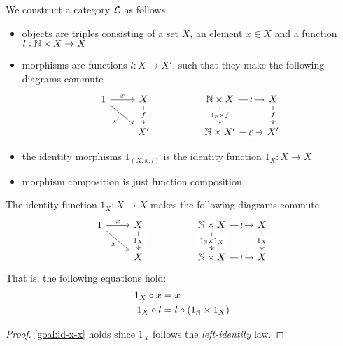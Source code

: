 \begin{solution}\label{sol:natlist_is_initial}
		We construct a category $\mathcal{L}$ as follows
		\begin{itemize}
			\item objects are triples consisting of a set $X$, an element $x \in X$ and a function $l : \mathbb{N} \times X \to X$
			\item morphisms are functions $l: X \to X'$, such that they make the following diagrams commute
      \[
        \begin{tikzcd}
          1 & X && {\NN \times X} & X \\
          & {X'} && {\NN \times X'} & {X'}
          \arrow["x", from=1-1, to=1-2]
          \arrow["{x'}"', from=1-1, to=2-2]
          \arrow["f"{description}, from=1-2, to=2-2]
          \arrow["l"{description}, from=1-4, to=1-5]
          \arrow["{l'}"{description}, from=2-4, to=2-5]
          \arrow["f"{description}, from=1-5, to=2-5]
          \arrow["{1_\NN \times f}"{description}, from=1-4, to=2-4]
        \end{tikzcd}
      \]
			\item the identity morphisms $1_{(X, x, l)}$ is the identity function $1_X : X \to X$
			\item morphism composition is just function composition
		\end{itemize}
		\begin{thm}
			The identity function $1_X : X \to X$ makes the following diagrams commute
			\[
				\begin{tikzcd}
					1 & X && {\NN \times X} & X \\
					& X && {\NN \times X} & X
					\arrow["x", from=1-1, to=1-2]
					\arrow["{x}"', from=1-1, to=2-2]
					\arrow["{1_X}"{description}, from=1-2, to=2-2]
					\arrow["l"{description}, from=1-4, to=1-5]
					\arrow["{l}"{description}, from=2-4, to=2-5]
					\arrow["{1_X}"{description}, from=1-5, to=2-5]
					\arrow["{1_\NN \times 1_X}"{description}, from=1-4, to=2-4]
				\end{tikzcd}
			\]
			That is, the following equations hold:
			\begin{align}
				\label{goal:id-x-x} 1_X \circ x & = x                                     \\
			  \label{goal:id-l-l-id} 1_X \circ l & = l \circ (1_{\mathbb{N}} \times 1_X)
			\end{align}
		\end{thm}
		\begin{proof}
			\eqref{goal:id-x-x} holds since $1_X$ follows the \textit{left-identity} law.


\end{proof}
\end{solution}

